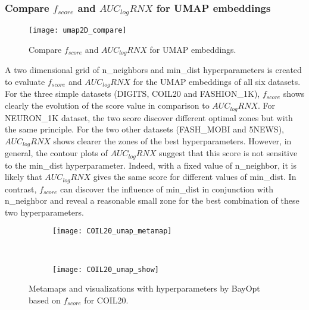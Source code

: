\subsubsection{Compare $f_{score}$ and $AUC_{log}RNX$ for UMAP embeddings}\label{sec:compare:umap}

\begin{figure}[ht!]
    \centering
    \texttt{[image: umap2D\_compare]}
    \caption{Compare $f_{score}$ and $AUC_{log}RNX$ for UMAP embeddings.}
    \label{fig:score:umap2D:compare}
\end{figure}

A two dimensional grid of {n\_neighbors} and {min\_dist} hyperparameters is created to evaluate $f_{score}$ and $AUC_{log}RNX$ for the UMAP embeddings of all six datasets.
For the three simple datasets (DIGITS, COIL20 and {FASHION\_1K}), $f_{score}$ shows clearly the evolution of the score value in comparison to $AUC_{log}RNX$.
For {NEURON\_1K} dataset, the two score discover different optimal zones but with the same principle.
For the two other datasets ({FASH\_MOBI} and 5NEWS), $AUC_{log}RNX$ shows clearer the zones of the best hyperparameters.
However, in general, the contour plots of $AUC_{log}RNX$ suggest that this score is not sensitive to the {min\_dist} hyperparameter.
Indeed, with a fixed value of {n\_neighbor}, it is likely that $AUC_{log}RNX$ gives the same score for different values of {min\_dist}.
In contrast, $f_{score}$ can discover the influence of {min\_dist} in conjunction with {n\_neighbor} and reveal a reasonable small zone for the best combination of these two hyperparameters.

\begin{figure*}[ht!]
    \centering
    \begin{subfigure}[b]{.8\linewidth}
        \centering
        \texttt{[image: COIL20\_umap\_metamap]}
    \end{subfigure}
    ~
    \begin{subfigure}[b]{.8\linewidth}
        \texttt{[image: COIL20\_umap\_show]}
    \end{subfigure}
    \caption{Metamaps and visualizations with hyperparameters by BayOpt based on $f_{score}$ for COIL20.}
    \label{fig:umap:meta:COIL20}
\end{figure*}

